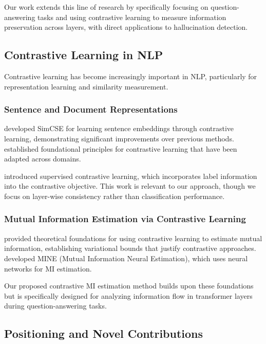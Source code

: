 Our work extends this line of research by specifically focusing on question-answering tasks and using contrastive learning to measure information preservation across layers, with direct applications to hallucination detection.

\subsection{Contrastive Learning in NLP}
\label{subsec:contrastive_nlp}

Contrastive learning has become increasingly important in NLP, particularly for representation learning and similarity measurement.

\subsubsection{Sentence and Document Representations}
\citet{gao2021simcse} developed SimCSE for learning sentence embeddings through contrastive learning, demonstrating significant improvements over previous methods. \citet{chen2020simclr} established foundational principles for contrastive learning that have been adapted across domains.

\citet{khosla2020supervised} introduced supervised contrastive learning, which incorporates label information into the contrastive objective. This work is relevant to our approach, though we focus on layer-wise consistency rather than classification performance.

\subsubsection{Mutual Information Estimation via Contrastive Learning}
\citet{poole2019variational} provided theoretical foundations for using contrastive learning to estimate mutual information, establishing variational bounds that justify contrastive approaches. \citet{belghazi2018mutual} developed MINE (Mutual Information Neural Estimation), which uses neural networks for MI estimation.

Our proposed contrastive MI estimation method builds upon these foundations but is specifically designed for analyzing information flow in transformer layers during question-answering tasks.

\subsection{Positioning and Novel Contributions}
\label{subsec:positioning}

